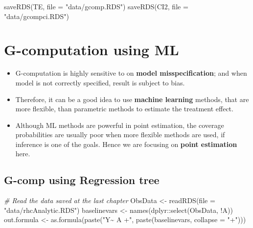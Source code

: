 \documentclass[
]{book}
\newenvironment{Shaded}{\begin{snugshade}}{\end{snugshade}}
\newcommand{\AttributeTok}[1]{\textcolor[rgb]{0.77,0.63,0.00}{#1}}
\newcommand{\CommentTok}[1]{\textcolor[rgb]{0.56,0.35,0.01}{\textit{#1}}}
\newcommand{\FunctionTok}[1]{\textcolor[rgb]{0.00,0.00,0.00}{#1}}
\newcommand{\NormalTok}[1]{#1}
\newcommand{\OtherTok}[1]{\textcolor[rgb]{0.56,0.35,0.01}{#1}}
\newcommand{\SpecialCharTok}[1]{\textcolor[rgb]{0.00,0.00,0.00}{#1}}
\newcommand{\StringTok}[1]{\textcolor[rgb]{0.31,0.60,0.02}{#1}}
\providecommand{\tightlist}{%
  \setlength{\itemsep}{0pt}\setlength{\parskip}{0pt}}
\begin{document}
\begin{Shaded}
\begin{Highlighting}[]
\FunctionTok{saveRDS}\NormalTok{(TE, }\AttributeTok{file =} \StringTok{"data/gcomp.RDS"}\NormalTok{)}
\FunctionTok{saveRDS}\NormalTok{(CI2, }\AttributeTok{file =} \StringTok{"data/gcompci.RDS"}\NormalTok{)}
\end{Highlighting}
\end{Shaded}

\hypertarget{g-computation-using-ml}{%
\chapter{G-computation using ML}\label{g-computation-using-ml}}

\begin{itemize}
\tightlist
\item
  G-computation is highly sensitive to on \textbf{model misspecification}; and when model is not correctly specified, result is subject to bias.
\item
  Therefore, it can be a good idea to use \textbf{machine learning} methods, that are more flexible, than parametric methods to estimate the treatment effect.
\item
  Although ML methods are powerful in point estimation, the coverage probabilities are usually poor when more flexible methods are used, if inference is one of the goals. Hence we are focusing on \textbf{point estimation} here.
\end{itemize}

\hypertarget{g-comp-using-regression-tree}{%
\section{G-comp using Regression tree}\label{g-comp-using-regression-tree}}

\begin{Shaded}
\begin{Highlighting}[]
\CommentTok{\# Read the data saved at the last chapter}
\NormalTok{ObsData }\OtherTok{\textless{}{-}} \FunctionTok{readRDS}\NormalTok{(}\AttributeTok{file =} \StringTok{"data/rhcAnalytic.RDS"}\NormalTok{)}
\NormalTok{baselinevars }\OtherTok{\textless{}{-}} \FunctionTok{names}\NormalTok{(dplyr}\SpecialCharTok{::}\FunctionTok{select}\NormalTok{(ObsData, }\SpecialCharTok{!}\NormalTok{A))}
\NormalTok{out.formula }\OtherTok{\textless{}{-}} \FunctionTok{as.formula}\NormalTok{(}\FunctionTok{paste}\NormalTok{(}\StringTok{"Y\textasciitilde{} A +"}\NormalTok{,}
                               \FunctionTok{paste}\NormalTok{(baselinevars,}
                                     \AttributeTok{collapse =} \StringTok{"+"}\NormalTok{)))}
\end{Highlighting}
\end{Shaded}
\end{document}
